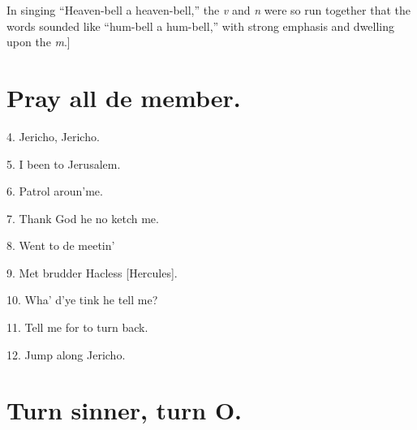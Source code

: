 \documentclass[a5paper,10pt]{book}
\begin{document}
In singing ``Heaven-bell a heaven-bell,'' the \emph{v} and \emph{n}
were so run together that the words sounded like ``hum-bell a
hum-bell,'' with strong emphasis and dwelling upon the \emph{m}.]


\newpage
\section{Pray all de member.}
\thispagestyle{empty}

\begin{song}

\end{song}

\begin{stanza}
\item[4.]
  Jericho, Jericho.
\item[5.]
  I been to Jerusalem.
\item[6.]
  Patrol aroun'me.
\item[7.]
  Thank God he no ketch me.
\item[8.]
  Went to de meetin'
\item[9.]
  Met brudder Hacless [Hercules].
\item[10.]
  Wha' d'ye tink he tell me?
\item[11.]
  Tell me for to turn back.
\item[12.]
  Jump along Jericho.
\end{stanza}

\begin{extra}
\end{extra}

\newpage
\section{Turn sinner, turn O.}
\thispagestyle{empty}

\begin{songpart}
\end{songpart}
\begin{songpart}
\end{songpart}
\begin{songpart}
\end{songpart}
\end{document}
